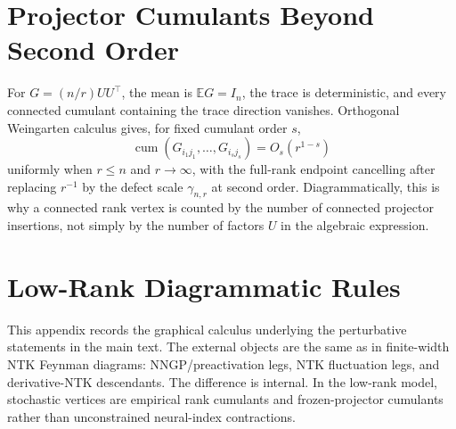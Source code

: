 \documentclass{article}
\newcommand{\E}{\mathbb E}
\newcommand{\cumul}{\operatorname{cum}}
\begin{document}
\section{Projector Cumulants Beyond Second Order}
For \(G=(n/r)UU^\top\), the mean is \(\E G=I_n\), the trace is deterministic, and every connected cumulant containing the trace direction vanishes. Orthogonal Weingarten calculus gives, for fixed cumulant order \(s\),
\begin{equation}
\cumul(G_{i_1j_1},\ldots,G_{i_sj_s})
=O_s(r^{1-s})
\end{equation}
uniformly when \(r\le n\) and \(r\to\infty\), with the full-rank endpoint cancelling after replacing \(r^{-1}\) by the defect scale \(\gamma_{n,r}\) at second order. Diagrammatically, this is why a connected rank vertex is counted by the number of connected projector insertions, not simply by the number of factors \(U\) in the algebraic expression.

\section{Low-Rank Diagrammatic Rules}
\label{app:diagrammatic-rules}
This appendix records the graphical calculus underlying the perturbative statements in the main text. The external objects are the same as in finite-width NTK Feynman diagrams: NNGP/preactivation legs, NTK fluctuation legs, and derivative-NTK descendants. The difference is internal. In the low-rank model, stochastic vertices are empirical rank cumulants and frozen-projector cumulants rather than unconstrained neural-index contractions.
\end{document}
